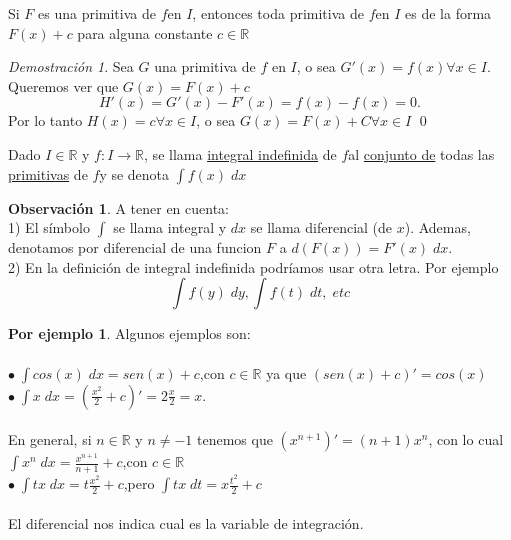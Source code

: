 \documentclass{article}
\theoremstyle{definition}
\theoremstyle{definition}
\newtheorem*{obs}{Observación}
\newtheorem*{ej}{Por ejemplo}
\theoremstyle{remark}
\newtheorem*{demo}{Demostración}
\newcommand\R{\ensuremath{\mathbb{R}}}
\newcommand\fun{$f$\;}
\newcommand\I{$I$\;}
\newcommand\e{$\in$\:}
\newcommand\bl{$\bullet\;$}
\begin{document}
\begin{teo}
Si $F$  es una primitiva de \fun en $I$, entonces toda primitiva de \fun en $I$ es de la forma $F(x)+c$ para alguna constante $c \in \R $
\end{teo}

\begin{demo}
Sea $G$ una primitiva de $f$ en $I$, o sea $G'(x)=f(x)$\quad$\forall x \in I$. \\
Queremos ver que $G(x)=F(x)+c$
$$H'(x)=G'(x)-F'(x)=f(x)-f(x)=0.$$
Por lo tanto $H(x)=c$\quad$\forall x \in I$, o sea $G(x)=F(x)+C$\quad $\forall x \in I$ \qed
\end{demo}
\pagebreak
\begin{defi}
  Dado \I \e \R \; y $f : I \to \R $, se llama \underline{integral indefinida} de \fun al \underline{conjunto de} todas las \underline{primitivas} de \fun y se denota $\int{f(x)\;dx}$
\end{defi}

\begin{obs}
A tener en cuenta: \\
1) El símbolo $\int$ se llama integral y $dx$ se llama diferencial (de $x$).
Ademas, denotamos por diferencial de una funcion $F$ a $d(F(x))=F'(x)\;dx$.\\
2) En la definición de integral indefinida podríamos usar otra letra. Por ejemplo $$\int{f(y)\;dy},\int{f(t)\;dt,\;etc}$$
\end{obs}

\begin{ej}
Algunos ejemplos son: \; \\\\
\bl $\int{cos(x)\;dx=sen(x)+c}$,\quad con $c\in\R$ ya que $(sen(x)+c)'=cos(x)$ \\

\bl $\int{x}\;dx=(\frac{x^2}{2}+c)'=2\frac{x}{2}=x$.\\\\
En general, si $n\in\R$ y $n\neq -1$ tenemos que $(x^{n+1})'=(n+1)x^n$, con lo cual \\
$\int{x^n\;dx}=\frac{x^{n+1}}{n+1}+c$,\quad con $c\in\R$\\

\bl $\int{tx\;dx}=t\frac{x^2}{2}+c$,\quad pero $\int{tx\;dt}=x\frac{t^2}{2}+c$\\\\
El diferencial nos indica cual es la variable de integración.
\end{ej}
\end{document}
